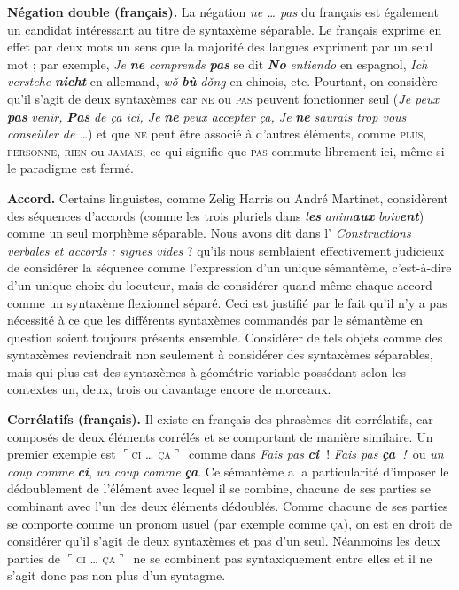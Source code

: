 {\noindent
    \textbf{Négation double (français).} La négation \textit{ne … pas} du français est également un candidat intéressant au titre de syntaxème séparable. Le français exprime en effet par deux mots un sens que la majorité des langues expriment par un seul mot ; par exemple, \textit{Je} \textbf{\textit{ne}} \textit{comprends} \textbf{\textit{pas}} se dit \textbf{\textit{No}} \textit{entiendo} en espagnol, \textit{Ich verstehe} \textbf{\textit{nicht}} en allemand, \textit{wǒ} \textbf{\textit{bù}} \textit{dǒng} en chinois, etc. Pourtant, on considère qu’il s’agit de deux syntaxèmes car \textsc{ne} ou \textsc{pas} peuvent fonctionner seul (\textit{Je peux} \textbf{\textit{pas}} \textit{venir,} \textbf{\textit{Pas}} \textit{de ça ici, Je} \textbf{\textit{ne}} \textit{peux accepter ça, Je} \textbf{\textit{ne}} \textit{saurais trop vous conseiller de …}) et que \textsc{ne} peut être associé à d’autres éléments, comme \textsc{plus,} \textsc{personne,} \textsc{rien} ou \textsc{jamais}, ce qui signifie que \textsc{pas} commute librement ici, même si le paradigme est fermé.

\noindent
    \textbf{Accord.} Certains linguistes, comme Zelig Harris ou André Martinet, considèrent des séquences d’accords (comme les trois pluriels dans \textit{l}\textbf{\textit{es} }\textit{anim}\textbf{\textit{aux}} \textit{boiv}\textbf{\textit{ent}}) comme un seul morphème séparable. Nous avons dit dans l’ \textit{Constructions verbales et accords : signes vides} ? qu’ils nous semblaient effectivement judicieux de considérer la séquence comme l’expression d’un unique sémantème, c’est-à-dire d’un unique choix du locuteur, mais de considérer quand même chaque accord comme un syntaxème flexionnel séparé. Ceci est justifié par le fait qu’il n’y a pas nécessité à ce que les différents syntaxèmes commandés par le sémantème en question soient toujours présents ensemble. Considérer de tels objets comme des syntaxèmes reviendrait non seulement à considérer des syntaxèmes séparables, mais qui plus est des syntaxèmes à géométrie variable possédant selon les contextes un, deux, trois ou davantage encore de morceaux.

\noindent
    \textbf{Corrélatifs (français).} Il existe en français des phrasèmes dit corrélatifs, car composés de deux éléments corrélés et se comportant de manière similaire. Un premier exemple est \textrm{$⌜$}\textsc{ci} \textsc{…} \textsc{ça}\textrm{$⌝$}~comme dans \textit{Fais pas} \textbf{\textit{ci~}}! \textit{Fais pas} \textbf{\textit{ça~}}\textit{!~}ou \textit{un coup comme} \textbf{\textit{ci}}, \textit{un coup comme} \textbf{\textit{ça}}. Ce sémantème a la particularité d’imposer le dédoublement de l’élément avec lequel il se combine, chacune de ses parties se combinant avec l’un des deux éléments dédoublés. Comme chacune de ses parties se comporte comme un pronom usuel (par exemple comme \textsc{ça}), on est en droit de considérer qu’il s’agit de deux syntaxèmes et pas d’un seul. Néanmoins les deux parties de \textrm{$⌜$}\textsc{ci} \textsc{…} \textsc{ça}\textrm{$⌝$}~ne se combinent pas syntaxiquement entre elles et il ne s’agit donc pas non plus d’un syntagme.

}
